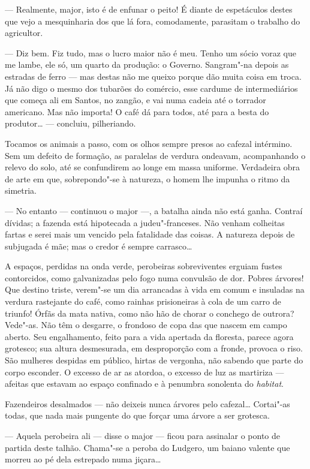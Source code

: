 --- Realmente, major, isto é de enfunar o peito! É diante de espetáculos
destes que vejo a mesquinharia dos que lá fora, comodamente, parasitam o
trabalho do agricultor.

--- Diz bem. Fiz tudo, mas o lucro maior não é meu. Tenho um sócio voraz
que me lambe, ele só, um quarto da produção: o Governo. Sangram"-na
depois as estradas de ferro --- mas destas não me queixo porque dão
muita coisa em troca. Já não digo o mesmo dos tubarões do comércio, esse
cardume de intermediários que começa ali em Santos, no zangão, e vai
numa cadeia até o torrador americano. Mas não importa! O café dá para
todos, até para a besta do produtor\ldots{} --- concluiu, pilheriando.

Tocamos os animais a passo, com os olhos sempre presos ao cafezal
intérmino. Sem um defeito de formação, as paralelas de verdura ondeavam,
acompanhando o relevo do solo, até se confundirem ao longe em massa
uniforme. Verdadeira obra de arte em que, sobrepondo"-se à natureza, o
homem lhe impunha o ritmo da simetria.

--- No entanto --- continuou o major ---, a batalha ainda não está
ganha. Contraí dívidas; a fazenda está hipotecada a judeu"-franceses. Não
venham colheitas fartas e serei mais um vencido pela fatalidade das
coisas. A natureza depois de subjugada é mãe; mas o credor é sempre
carrasco\ldots{}

A espaços, perdidas na onda verde, perobeiras sobreviventes erguiam
fustes contorcidos, como galvanizadas pelo fogo numa convulsão de dor.
Pobres árvores! Que destino triste, verem"-se um dia arrancadas à vida em
comum e insuladas na verdura rastejante do café, como rainhas
prisioneiras à cola de um carro de triunfo! Órfãs da mata nativa, como
não hão de chorar o conchego de outrora? Vede"-as. Não têm o desgarre, o
frondoso de copa das que nascem em campo aberto. Seu engalhamento, feito
para a vida apertada da floresta, parece agora grotesco; sua altura
desmesurada, em desproporção com a fronde, provoca o riso. São mulheres
despidas em público, hirtas de vergonha, não sabendo que parte do corpo
esconder. O excesso de ar as atordoa, o excesso de luz as martiriza ---
afeitas que estavam ao espaço confinado e à penumbra sonolenta do
\emph{habitat}.

Fazendeiros desalmados --- não deixeis nunca árvores pelo cafezal\ldots{}
Cortai"-as todas, que nada mais pungente do que forçar uma árvore a ser
grotesca.

--- Aquela perobeira ali --- disse o major --- ficou para assinalar o
ponto de partida deste talhão. Chama"-se a peroba do Ludgero, um baiano
valente que morreu ao pé dela estrepado numa jiçara\ldots{}

